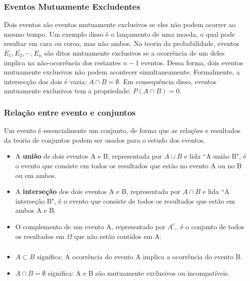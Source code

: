 \documentclass[14pt,aspectratio=1610]{beamer}
\begin{document}
\begin{frame}{}
\frametitle{Eventos Mutuamente Excludentes}
\begin{block}{}
\justifying
Dois eventos são eventos mutuamente exclusivos se eles não podem ocorrer ao mesmo tempo. Um exemplo disso é o lançamento de uma moeda, o qual pode resultar em cara ou coroa, mas não ambos. Na teoria da probabilidade, eventos $E_{1}, E_{2},\cdots, E_{n}$ são ditos mutuamente exclusivos se a ocorrência de um deles implica na não-ocorrência dos restantes $n - 1$ eventos. Dessa forma, dois eventos mutuamente exclusivos não podem acontecer simultaneamente. Formalmente, a intersecção dos dois é vazia: 
$A\cap B =\emptyset.$ Em consequência disso, eventos mutuamente exclusivos tem a propriedade: $P(A\cap B) = 0.$
\end{block}
\end{frame}

\begin{frame}{}
\frametitle{Relação entre evento e conjuntos}
\begin{block}{}
\justifying
Um evento é essencialmente um conjunto, de forma que as relações e resultados da teoria de conjuntos podem ser usados para o estudo dos eventos. 
\begin{itemize}
\item A {\bf união} de dois eventos A e B, representada por $A\cup B$ e lida ``A união B", é o evento que consiste em todos os resultados que estão no evento A ou no B ou em ambos. \pause
\item A {\bf interseção} dos dois eventos A e B, representada por $A\cap B$ e lida ``A interseção B", é o evento que consiste de todos os resultados que estão em ambos A e B. \pause
\item O complemento de um evento A, representado por $A^{c},$ é o conjunto de todos os resultados em $\Omega$ que não estão contidos em A.
\end{itemize}
\end{block}
\end{frame}

\begin{frame}{}
\frametitle{}
\begin{block}{}
\justifying
\begin{itemize}
\item $A\subset B$ significa: A ocorrência do evento A implica a ocorrência do evento B. \pause
\item $A\cap B=\emptyset$ significa: A e B são mutuamente exclusivos ou incompatíveis.
\end{itemize}
\end{block}
\end{frame}
\end{document}
